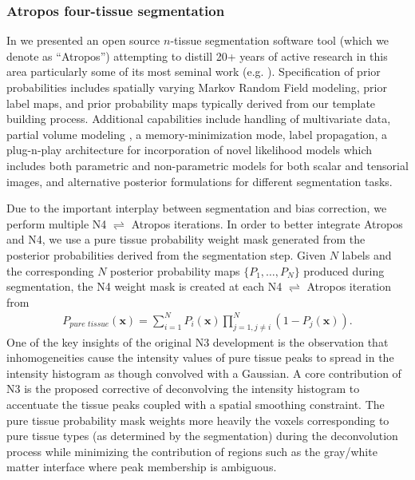 \subsubsection{Atropos four-tissue segmentation}

In \cite{avants2011a} we presented an open source $n$-tissue segmentation software tool
(which we denote as ``Atropos'') attempting to distill 20+ years of active research in this area
particularly some of its most seminal work (e.g. \cite{zhang2001,ashburner2005}). 
Specification of prior probabilities includes spatially varying Markov Random Field modeling, 
prior label maps, and prior probability maps typically derived from our template building 
process.  Additional
capabilities include handling of multivariate data, 
partial volume modeling \citep{shattuck2001}, a memory-minimization mode,
label propagation, a plug-n-play architecture for incorporation of novel likelihood models
which includes both parametric and non-parametric models for both scalar and tensorial
images, and alternative posterior formulations for different segmentation tasks.

Due to the important interplay between segmentation and bias correction,
we perform multiple N4 $\rightleftharpoons$ Atropos iterations.
In order to better integrate Atropos and N4, we use  
a pure tissue probability weight mask generated from the 
posterior probabilities derived from the segmentation 
step.  Given $N$ labels and the corresponding $N$
posterior probability maps $\{ P_1, \ldots, P_N\}$ produced
during segmentation, the N4 weight mask is 
created at each N4 $\rightleftharpoons$ Atropos iteration from
\begin{align}
  P_{pure\,\,tissue}(\mathbf{x}) = \sum_{i=1}^N P_i(\mathbf{x}) \prod_{j=1, j \neq i}^N \left( 1 - P_j(\mathbf{x}) \right).
\end{align}
One of the key insights of the original N3 development is the
observation that inhomogeneities cause the intensity values of
pure tissue peaks to spread in the intensity histogram as though
convolved with a Gaussian.  A core contribution of N3 is the
proposed corrective of deconvolving the intensity histogram to 
accentuate the tissue peaks coupled with a spatial smoothing 
constraint. The pure tissue probability mask
weights more heavily the voxels corresponding to pure tissue 
types (as determined by the segmentation) during the deconvolution process 
while minimizing the contribution of regions such as the gray/white matter 
interface where peak membership is ambiguous. 

